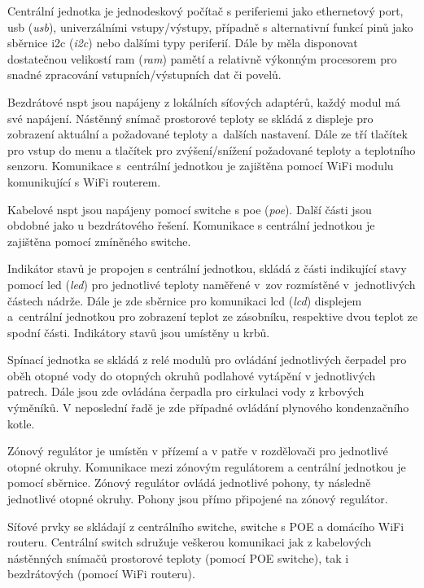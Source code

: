 Centrální jednotka je jednodeskový počítač s periferiemi jako ethernetový port, \acrshort{usb} (\textit{\acrlong{usb}}), univerzálními vstupy/výstupy, případně s alternativní funkcí pinů jako sběrnice \acrshort{i2c} (\textit{\acrlong{i2c}}) nebo dalšími typy periferií. Dále by měla disponovat dostatečnou velikostí \acrshort{ram} (\textit{\acrlong{ram}}) pamětí a relativně výkonným procesorem pro snadné zpracování vstupních/výstupních dat či povelů.

Bezdrátové \acrshort{nspt} jsou napájeny z lokálních síťových adaptérů, každý modul má své napájení. Nástěnný snímač prostorové teploty se skládá z displeje pro zobrazení aktuální a požadované teploty a~dalších nastavení. Dále ze tří tlačítek pro vstup do menu a tlačítek pro zvýšení/snížení požadované teploty a teplotního senzoru. Komunikace s~centrální jednotkou je zajištěna pomocí WiFi modulu komunikující s WiFi routerem.

Kabelové \acrshort{nspt} jsou napájeny pomocí switche s  \acrshort{poe} (\textit{\acrlong{poe}}). Další části jsou obdobné jako u bezdrátového řešení. Komunikace s centrální jednotkou je zajištěna pomocí zmíněného switche.

Indikátor stavů je propojen s centrální jednotkou, skládá z části indikující stavy pomocí \acrshort{led} (\textit{\acrlong{led}}) pro jednotlivé teploty naměřené v~\acrshort{zov} rozmístěné v~jednotlivých částech nádrže. Dále je zde sběrnice pro komunikaci \acrshort{lcd} (\textit{\acrlong{lcd}}) displejem a~centrální jednotkou pro zobrazení teplot ze zásobníku, respektive dvou teplot ze spodní části. Indikátory stavů jsou umístěny u krbů.

Spínací jednotka se skládá z relé modulů pro ovládání jednotlivých čerpadel pro oběh otopné vody do otopných okruhů podlahové vytápění v jednotlivých patrech. Dále jsou zde ovládána čerpadla pro cirkulaci vody z krbových výměníků. V neposlední řadě je zde případné ovládání plynového kondenzačního kotle.

Zónový regulátor je umístěn v přízemí a v patře v rozdělovači pro jednotlivé otopné okruhy. Komunikace mezi zónovým regulátorem a centrální jednotkou je pomocí sběrnice. Zónový regulátor ovládá jednotlivé pohony, ty následně jednotlivé otopné okruhy. Pohony jsou přímo připojené na zónový regulátor.

Síťové prvky se skládají z centrálního switche, switche s POE a domácího WiFi routeru. Centrální switch sdružuje veškerou komunikaci jak z kabelových nástěnných snímačů prostorové teploty (pomocí POE switche), tak i bezdrátových (pomocí WiFi routeru). 

